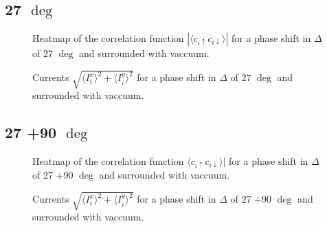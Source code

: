 \documentclass[..\main.tex]{subfile}
\begin{document}
\subsection{27 $\deg$}
\begin{figure}[H]
    \centering
    
    \caption{Heatmap of the correlation function $|\langle c_{i\uparrow} c_{i\downarrow}\rangle|$ for a phase shift in $\Delta$ of 27 $\deg$ and surrounded with vaccuum.}
\end{figure}

\begin{figure}[H]
    \centering
    
    \caption{Currents $\sqrt{\langle I^x_i\rangle^2 + \langle I^y_i\rangle^2}$ for a phase shift in $\Delta$ of 27 $\deg$ and surrounded with vaccuum.}
\end{figure}

\subsection{27 +90 $\deg$}
\begin{figure}[H]
    \centering
    
    \caption{Heatmap of the correlation function $\langle c_{i\uparrow} c_{i\downarrow}\rangle|$ for a phase shift in $\Delta$ of 27 +90 $\deg$ and surrounded with vaccuum.}
\end{figure}

\begin{figure}[H]
    \centering
    
        \caption{Currents $\sqrt{\langle I^x_i\rangle^2 + \langle I^y_i\rangle^2}$ for a phase shift in $\Delta$ of 27 +90 $\deg$ and surrounded with vaccuum.}
\end{figure}
\end{document}
